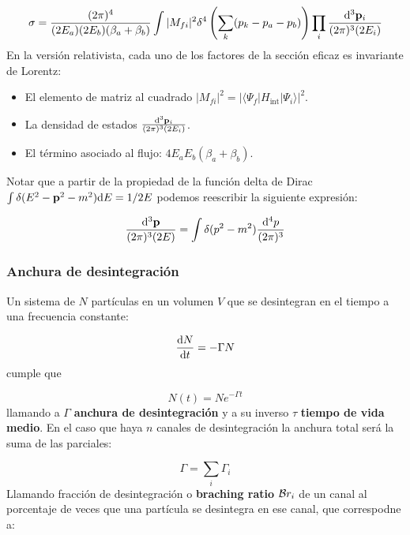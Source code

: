 \begin{equation}
	\sigma = \frac{(2\pi)^4}{(2E_a)(2E_b)(\beta_a+\beta_b)} \int |M_{fi}|^2 \delta^4 \left( \sum_k (p_k-p_a-p_b) \right)\prod_i \frac{\mathrm{d}^3 \mathbf{p}_i}{(2\pi)^3(2E_i)}
\end{equation}
En la versión relativista, cada uno de los factores de la sección eficaz es invariante de Lorentz:

\begin{itemize}
	\item El elemento de matriz al cuadrado $|M_{fi}|^2 = |\langle \Psi_f |H_{\text{int}}|\Psi_i \rangle|^2 $.
	\item La densidad de estados $\frac{\mathrm{d}^3 \mathbf{p}_i}{(2\pi)^3(2E_i)}$.
	\item El término asociado al flujo: $4E_aE_b(\beta_a+\beta_b)$.
\end{itemize}
Notar que a partir de la propiedad de la función delta de Dirac $\int \delta(E^2-\mathbf{p}^2-m^2)\mathrm{d} E = 1/2E$ podemos reescribir la siguiente expresión:

\begin{equation}
	\frac{\mathrm{d}^3 \mathbf{p}}{(2\pi)^3 (2E) } = \int \delta(p^2-m^2) \frac{\mathrm{d}^4 p}{(2\pi)^3}
\end{equation}

\subsubsection{Anchura de desintegración}

Un sistema de $N$ partículas en un volumen $V$ que se desintegran en el tiempo a una frecuencia constante:

\begin{equation}
	\frac{\mathrm{d} N}{\mathrm{d} t} = - \Gamma N
\end{equation}
cumple que 

\begin{equation}
	N(t) = N e^{-\Gamma t}
\end{equation}
llamando a $\Gamma$ \textbf{anchura de desintegración} y a su inverso $\tau$ \textbf{tiempo de vida medio}. En el caso que haya $n$ canales de desintegración la anchura total será la suma de las parciales:

\begin{equation}
	\Gamma = \sum_i \Gamma_i
\end{equation}
Llamando fracción de desintegración o \textbf{braching ratio} $\mathcal{B} r_i$ de un canal al porcentaje de veces que una partícula se desintegra en ese  canal, que correspodne a:

